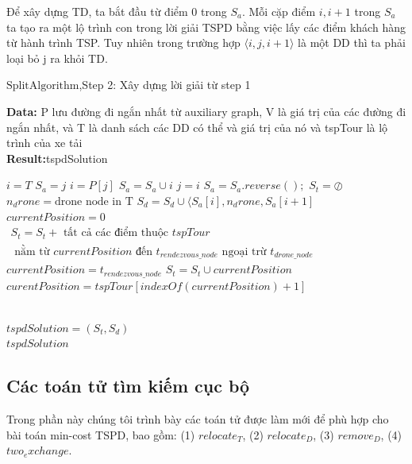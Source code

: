 \documentclass[a4paper,12pt]{report}
\begin{document}
Để xây dựng TD, ta bắt đầu từ điểm 0 trong $S_a$. Mỗi cặp điểm $i,i+1$ trong  $S_a$ ta tạo ra một lộ trình con trong lời giải TSPD bằng việc lấy  các điểm khách hàng từ hành trình TSP. Tuy nhiên trong trường hợp $\langle i,j,i+1 \rangle$ là một DD thì ta phải loại bỏ j ra khỏi TD.

\begin{algorithm}[H]
\caption{$\text{SplitAlgorithm}$,Step 2: Xây dựng lời giải từ step 1}
\textbf{Data:} P lưu đường đi ngắn nhất từ auxiliary graph, V là giá trị của các đường đi ngắn nhất, và T là danh sách các DD có thể và giá trị của nó và tspTour là lộ trình của xe tải\\
\textbf{Result:}tspdSolution
\begin{algorithmic}[1]
\State $i=T$
\State $S_a=j$
\State $i=P[j]$
\State $S_a=S_a \cup i$
\State $j=i $  
\EndWhile
\State $S_a=S_a.reverse();$
\State $S_t=\oslash$ 
\State $n_drone=\text{drone node in T} $ 
\State $S_d=S_d \cup \langle S_a[i],n_drone,S_a[i+1]$
\EndIf
\EndFor 
\State $currentPosition=0$
\State $\begin{array}{l}  S_t=S_t+ \text{ tất cả các điểm thuộc } tspTour \\ \text{ nằm từ } currentPosition \text{ đến } t_{ rendezvous\_node }\text{ ngoại trừ } t_{ drone\_node } \end{array}$
\State $currentPosition=t_{rendezvous\_node}$
\Else
\State $S_t=S_t \cup currentPosition $
\State $curentPosition=tspTour[indexOf(currentPosition)+1]$
\EndIf

\EndWhile\\
\State $tspdSolution=(S_t,S_d)$\\
\Return $tspdSolution$
\end{algorithmic}
\label{alg:SPLIT2}
\end{algorithm}
\subsection{Các toán tử tìm kiếm cục bộ}
Trong phần này chúng tôi trình bày các toán tử được làm mới để phù hợp cho bài toán min-cost TSPD, bao gồm: (1) $relocate_T$, (2) $relocate_D$, (3) $remove_D$, (4) $two_exchange$. \\
\end{document}
